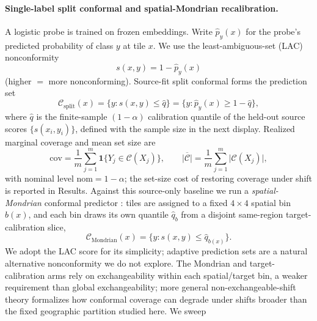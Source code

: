 \documentclass[preprint,11pt,authoryear]{elsarticle}
\begin{document}
\paragraph{Single-label split conformal and spatial-Mondrian recalibration.}
A logistic probe is trained on frozen embeddings. Write $\hat p_y(x)$ for the probe's predicted probability of
class $y$ at tile $x$. We use the least-ambiguous-set (LAC) nonconformity
\citep{sadinle2019lac}
\begin{equation}
\label{eq:lac-score}
s(x,y)=1-\hat p_y(x)
\end{equation}
(higher $=$ more nonconforming). Source-fit split conformal
\citep{vovk2005algorithmic,angelopoulos2023conformal} forms the prediction set
\begin{equation}
\label{eq:split-cp}
\mathcal{C}_{\mathrm{split}}(x)=\bigl\{y:s(x,y)\le\hat q\bigr\}
=\bigl\{y:\hat p_y(x)\ge 1-\hat q\bigr\},
\end{equation}
where $\hat q$ is the finite-sample $(1-\alpha)$ calibration quantile of the held-out source scores
$\{s(x_i,y_i)\}$, defined with the sample size in the next display. Realized marginal coverage and mean set size are
\begin{equation}
\label{eq:coverage}
\mathrm{cov}
=\frac{1}{m}\sum_{j=1}^{m}\mathbf{1}\bigl\{Y_j\in\mathcal{C}(X_j)\bigr\},
\qquad
\overline{|\mathcal{C}|}
=\frac{1}{m}\sum_{j=1}^{m}\bigl|\mathcal{C}(X_j)\bigr|,
\end{equation}
with nominal level $\mathrm{nom}=1-\alpha$; the set-size cost of restoring coverage under shift is reported
in Results. Against this source-only baseline we run a
\emph{spatial-Mondrian} conformal predictor \citep{vovk2003mondrian}: tiles are assigned to a fixed
$4{\times}4$ spatial bin $b(x)$, and each bin draws its own quantile $\hat q_{b}$ from a disjoint
same-region target-calibration slice,
\begin{equation}
\label{eq:mondrian}
\mathcal{C}_{\mathrm{Mondrian}}(x)
=\bigl\{y:s(x,y)\le\hat q_{b(x)}\bigr\}.
\end{equation}
We adopt the LAC score for its simplicity; adaptive prediction sets \citep{romano2020classification} are a
natural alternative nonconformity we do not explore. The Mondrian and target-calibration arms rely on
exchangeability within each spatial/target bin, a weaker requirement than global exchangeability; more
general non-exchangeable-shift theory \citep{barber2023conformal} formalizes how conformal coverage can
degrade under shifts broader than the fixed geographic partition studied here. We sweep
\end{document}
